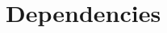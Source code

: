 \documentclass[titlepage]{article}
\begin{document}
%    
%


\clearpage

\section{Dependencies
    \label{Dependencies}
}
\end{document}
